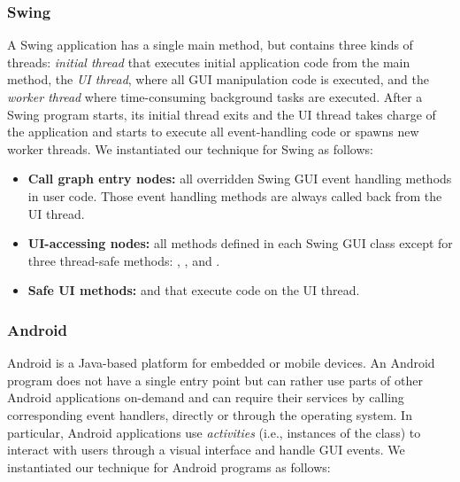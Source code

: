 \subsubsection{Swing}


A Swing application has a single main method, but contains three kinds of
threads: \textit{initial thread} that executes initial application code from the main method,
the \textit{UI thread}, where all GUI manipulation code is executed,
and the \textit{worker thread} where time-consuming background tasks are executed.
After a Swing program starts, its initial thread exits and the UI thread takes charge
of the application and starts to execute all event-handling code or spawns new worker threads. 
We instantiated our technique for Swing as follows:

\begin{itemize}

\item \textbf{Call graph entry nodes:} all overridden Swing GUI event handling
methods in user code. Those event handling methods are always
called back from the UI thread.

\smallstep

\item \textbf{UI-accessing nodes:} %
all methods defined in each Swing GUI class except for three thread-safe
methods: , , and .

\smallstep

\item \textbf{Safe UI methods: } 
 and  that execute code on the UI thread.

\end{itemize}

\smallstep

\subsubsection{Android}

Android is a Java-based platform for embedded or mobile devices. 
An Android program does not have a single entry point but can
rather use parts of other Android applications on-demand and can require their
services by calling corresponding event handlers, directly or through the
operating system. In particular, Android applications use \textit{activities}
(i.e., instances of the  class)
to interact with users through a visual interface and handle GUI events.
We instantiated our technique for Android programs as follows:

